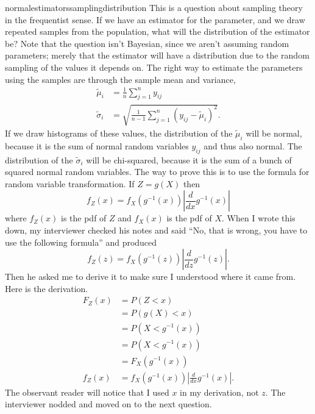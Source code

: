 \begin{answer}{normalestimatorssamplingdistribution}
This is a question about sampling theory in the frequentist sense.
If we have an estimator for the parameter, and we draw repeated samples from the population, what will the distribution of the estimator be?
Note that the question isn't Bayesian, since we aren't assuming random parameters; merely that the estimator will have a distribution due to the random sampling of the values it depends on.
The right way to estimate the parameters using the samples are through the sample mean and variance,
\begin{align*}
  \tilde{\mu}_i &= \frac{1}{n}\sum_{j=1}^{n}{y_{ij}} \\
  \tilde{\sigma}_i &=
 \sqrt{ \frac{1}{n-1} \sum_{j=1}^{n}{(y_{ij} - \tilde{\mu}_i)^2} }
 \text{.}
\end{align*}
If we draw histograms of these values, the distribution of the
$\tilde{\mu}_i$
will be normal,
because it is the sum of normal random variables $y_{ij}$ and thus also normal.
The distribution of the
$\tilde{\sigma}_i$
will be chi-squared, because it is the sum of a bunch of squared normal random variables.
The way to prove this is to use the formula for random variable transformation.
If $Z = g(X)$
then
\[
  f_Z(x) =  f_X( g^{-1}(x) )\left| \frac{d}{dx} g^{-1}(x) \right|
\]
where
$f_Z(x)$ is the pdf of $Z$ and
$f_X(x)$ is the pdf of $X$.
When I wrote this down, my interviewer
checked his notes and said
``No, that is wrong, you have to use the following formula'' and produced
\[
  f_Z(z) =  f_X( g^{-1}(z) )\left| \frac{d}{dz} g^{-1}(z) \right|
  \text{.}
\]
Then he asked me to derive it to make sure I understood where it came from.
Here is the derivation.
\begin{align*}
  F_Z(x)
  &=  P(Z < x) \\
  &=  P(g(X) < x) \\
  &=  P(X < g^{-1}(x)) \\
  &=  P(X < g^{-1}(x)) \\
  &=  F_X( g^{-1}(x) ) \\
  f_Z(x) &=  f_X( g^{-1}(x) )\left| \frac{d}{dx} g^{-1}(x) \right|
  \text{.}
\end{align*}
The observant reader will notice that I used $x$ in my derivation, not $z$.
The interviewer nodded and moved on to the next question.
\end{answer}
